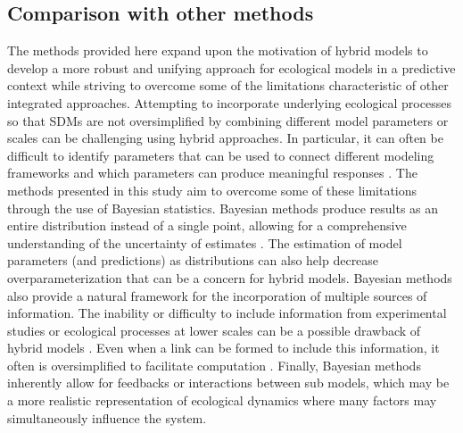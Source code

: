\documentclass[11pt]{article}
\begin{document}
\subsection*{Comparison with other methods}
The methods provided here expand upon the motivation of hybrid models to develop a more robust and unifying approach for ecological models in a predictive context while striving to overcome some of the limitations characteristic of other integrated approaches. 
Attempting to incorporate underlying ecological processes so that SDMs are not oversimplified by combining different model parameters or scales can be challenging using hybrid approaches. 
In particular, it can often be difficult to identify parameters that can be used to connect different modeling frameworks and which parameters can produce meaningful responses \citep{Thuiller2013}. 
The methods presented in this study aim to overcome some of these limitations through the use of Bayesian statistics. 
Bayesian methods produce results as an entire distribution instead of a single point, allowing for a comprehensive understanding of the uncertainty of estimates \citep{Link2010}. 
The estimation of model parameters (and predictions) as distributions can also help decrease overparameterization that can be a concern for hybrid models. 
Bayesian methods also provide a natural framework for the incorporation of multiple sources of information. 
The inability or difficulty to include information from experimental studies or ecological processes at lower scales can be a possible drawback of hybrid models \citep{Thuiller2008, Smolik2010, Thuiller2014a}. 
Even when a link can be formed to include this information, it often is oversimplified to facilitate computation \citep{Gallien2010}. 
Finally, Bayesian methods inherently allow for feedbacks or interactions between sub models, which may be a more realistic representation of ecological dynamics where many factors may simultaneously influence the system.
\end{document}
